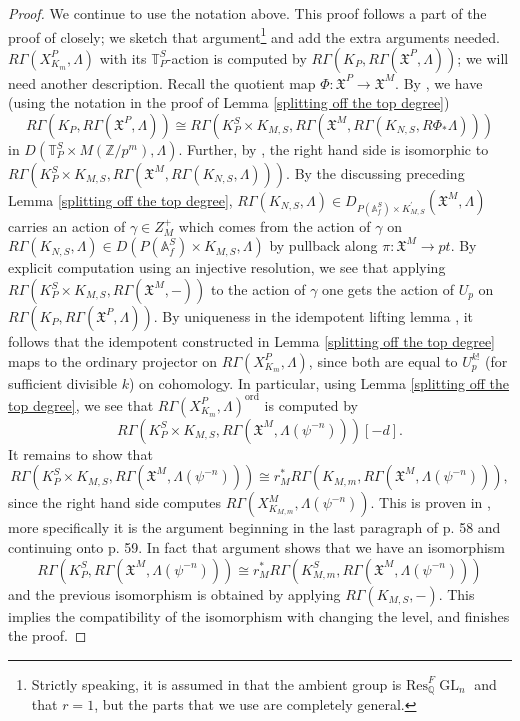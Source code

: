 \documentclass{amsart}
\theoremstyle{remark}
\numberwithin{equation}{subsection}
\newcommand{\A}{\AA}
\newcommand{\Q}{\QQ}
\newcommand{\Z}{\ZZ}
\renewcommand{\AA}{{\mathbb A}}
\newcommand{\QQ}{{\mathbb Q}}
\newcommand{\ZZ}{{\mathbb Z}}
\newcommand{\XP}[1][m]{X^{P}_{K_{#1}}}
\DeclareMathOperator{\GL}{GL}
\newcommand{\mf}{\mathfrak}
\renewcommand{\(}{\left(}
\renewcommand{\)}{\right)}
\begin{document}
\begin{proof}
We continue to use the notation above. This proof follows a part of the proof of \cite[Lemma 4.4]{newton-thorne} closely; we sketch that argument\footnote{Strictly speaking, it is assumed in \cite[Lemma 4.4]{newton-thorne} that the ambient group is $\mathrm{Res}_\Q^F\GL_n$ and that $r=1$, but the parts that we use are completely general.} and add the extra arguments needed. $R\Gamma(\XP,\Lambda)$ with its $\mathbb{T}_P^S$-action is computed by $R\Gamma(K_P,R\Gamma(\mf{X}^P,\Lambda))$; we will need another description. Recall the quotient map $\Phi : \mf{X}^P \to \mf{X}^M$. By \cite[Equation (4.4)]{newton-thorne}, we have (using the notation in the proof of Lemma \ref{splitting off the top degree})
\[
R\Gamma(K_P,R\Gamma(\mf{X}^P,\Lambda)) \cong R\Gamma \left( K_P^S \times K_{M,S}, R\Gamma \left( \mf{X}^M,R\Gamma(K_{N,S},R\Phi_\ast \Lambda) \right) \right)
\]
in $D(\mathbb{T}_P^S \times M(\Z/p^m),\Lambda)$. Further, by \cite[Equation (4.7)]{newton-thorne}, the right hand side is isomorphic to $R\Gamma \left( K_P^S \times K_{M,S}, R\Gamma \left( \mf{X}^M,R\Gamma(K_{N,S},\Lambda) \right) \right) $. By the discussing preceding Lemma \ref{splitting off the top degree}, $R\Gamma(K_{N,S},\Lambda) \in D_{P(\A_f^S)\times K_{M,S}^\prime}(\mf{X}^M,\Lambda)$ carries an action of $\gamma \in Z_M^+$ which comes from the action of $\gamma$ on $R\Gamma(K_{N,S},\Lambda) \in D(P(\A_f^S)\times K_{M,S},\Lambda)$ by pullback along $\pi : \mf{X}^M \to pt$. By explicit computation using an injective resolution, we see that applying  $R\Gamma \left( K_P^S \times K_{M,S}, R\Gamma ( \mf{X}^M,-) \right)$ to the action of $\gamma$ one gets the action of $U_p$ on $R\Gamma(K_P,R\Gamma(\mf{X}^P,\Lambda))$. By uniqueness in the idempotent lifting lemma \cite[Tag 00J9]{stacks-project}, it follows that the idempotent constructed in Lemma \ref{splitting off the top degree} maps to the ordinary projector on $R\Gamma(\XP,\Lambda)$, since both are equal to $U_p^{k!}$ (for sufficient divisible $k$) on cohomology. In particular, using Lemma \ref{splitting off the top degree}, we see that $R\Gamma(\XP,\Lambda)^\mathrm{ord}$ is computed by 
\[
R\Gamma \left( K_P^S \times K_{M,S}, R\Gamma \left( \mf{X}^M,\Lambda(\psi^{-n}) \right) \right)[-d].
\]
It remains to show that 
\[
R\Gamma \left( K_P^S \times K_{M,S}, R\Gamma \left( \mf{X}^M,\Lambda(\psi^{-n}) \right) \right) \cong r_M^\ast R\Gamma(K_{M,m},R\Gamma(\mf{X}^M,\Lambda(\psi^{-n}))),
\] 
since the right hand side computes $R\Gamma(X_{K_{M,m}}^M,\Lambda(\psi^{-n}))$. This is proven in \cite[p. 58-59]{newton-thorne}, more specifically it is the argument beginning in the last paragraph of p. 58 and continuing onto p. 59. In fact that argument shows that we have an isomorphism  
\[
R\Gamma \left( K_P^S, R\Gamma \left( \mf{X}^M,\Lambda(\psi^{-n}) \right) \right) \cong r_M^\ast R\Gamma(K^S_{M,m},R\Gamma(\mf{X}^M,\Lambda(\psi^{-n})))
\]
and the previous isomorphism is obtained by applying $R\Gamma(K_{M,S},-)$. This implies the compatibility of the isomorphism with changing the level, and finishes the proof.
\end{proof}
\end{document}
